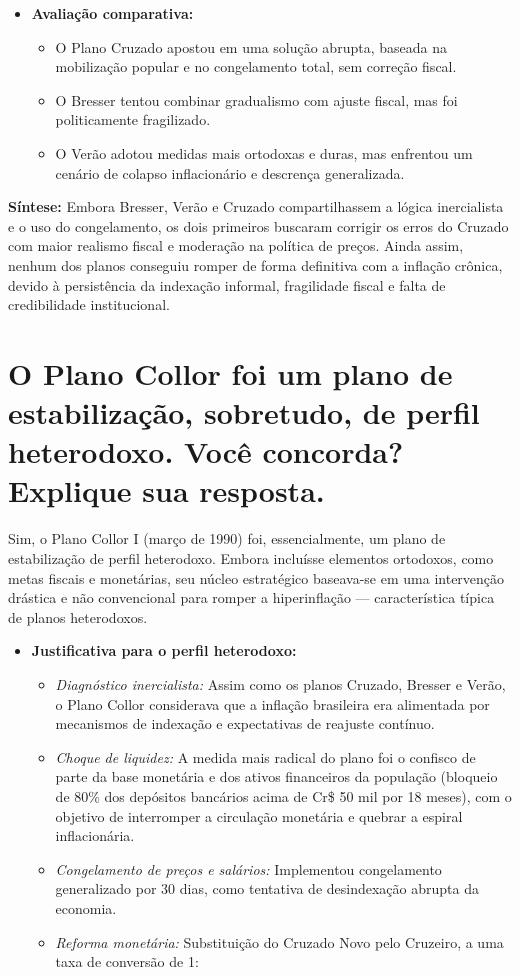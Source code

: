 \documentclass{sciposter}
\begin{document}
\begin{multicols}{3}
\begin{itemize}
    \item \textbf{ Avaliação comparativa:}
    \begin{itemize}
        \item O Plano Cruzado apostou em uma solução abrupta, baseada na mobilização popular e no congelamento total, sem correção fiscal.
        \item O Bresser tentou combinar gradualismo com ajuste fiscal, mas foi politicamente fragilizado.
        \item O Verão adotou medidas mais ortodoxas e duras, mas enfrentou um cenário de colapso inflacionário e descrença generalizada.
    \end{itemize}
\end{itemize}

\textbf{Síntese:} Embora Bresser, Verão e Cruzado compartilhassem a lógica inercialista e o uso do congelamento, os dois primeiros buscaram corrigir os erros do Cruzado com maior realismo fiscal e moderação na política de preços. Ainda assim, nenhum dos planos conseguiu romper de forma definitiva com a inflação crônica, devido à persistência da indexação informal, fragilidade fiscal e falta de credibilidade institucional.

\section{\textbf{O Plano Collor foi um plano de estabilização, sobretudo, de perfil heterodoxo. Você concorda? Explique sua resposta.}}

Sim, o Plano Collor I (março de 1990) foi, essencialmente, um plano de estabilização de perfil heterodoxo. Embora incluísse elementos ortodoxos, como metas fiscais e monetárias, seu núcleo estratégico baseava-se em uma intervenção drástica e não convencional para romper a hiperinflação — característica típica de planos heterodoxos.

\begin{itemize}
    \item \textbf{ Justificativa para o perfil heterodoxo:}
    \begin{itemize}
        \item \textit{Diagnóstico inercialista:} Assim como os planos Cruzado, Bresser e Verão, o Plano Collor considerava que a inflação brasileira era alimentada por mecanismos de indexação e expectativas de reajuste contínuo.
        \item \textit{Choque de liquidez:} A medida mais radical do plano foi o confisco de parte da base monetária e dos ativos financeiros da população (bloqueio de 80\% dos depósitos bancários acima de Cr\$ 50 mil por 18 meses), com o objetivo de interromper a circulação monetária e quebrar a espiral inflacionária.
        \item \textit{Congelamento de preços e salários:} Implementou congelamento generalizado por 30 dias, como tentativa de desindexação abrupta da economia.
        \item \textit{Reforma monetária:} Substituição do Cruzado Novo pelo Cruzeiro, a uma taxa de conversão de 1:
    \end{itemize}


\end{itemize}
\end{multicols}
\end{document}

